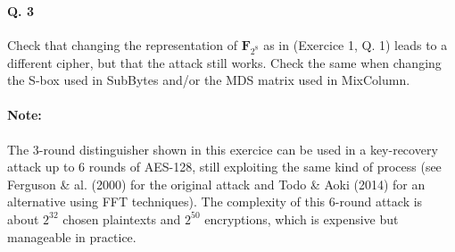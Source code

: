 \documentclass[a4paper,11pt]{article}
\begin{document}
\paragraph*{Q. 3} Check that changing the representation of $\mathbf{F}_{2^8}$ as in (Exercice 1, Q. 1) leads to a different cipher, but that the
attack still works. Check the same when changing the S-box used in SubBytes and/or the MDS matrix used in MixColumn.

\paragraph*{Note:} The 3-round distinguisher shown in this exercice can be used in a key-recovery attack up to 6 rounds of AES-128, still exploiting
the same kind of process (see Ferguson \& al. (2000) for the original attack and Todo \& Aoki (2014) for an alternative using FFT techniques).
The complexity of this 6-round attack is about $2^{32}$ chosen plaintexts and $2^{50}$ encryptions, which is expensive but manageable in practice.
\end{document}
